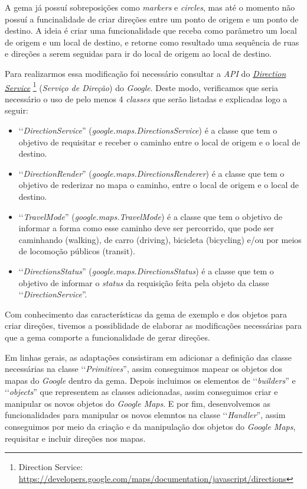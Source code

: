 A gema já possuí sobreposições como \emph{markers} e \emph{circles}, mas até o momento não possuí a 
funcinalidade de criar direções entre um ponto de origem e um ponto de destino. A ideia é criar 
uma funcionalidade que receba como parâmetro um local de origem e um local de destino, e retorne como
resultado uma sequência de ruas e direções a serem seguidas para ir do local de origem ao local de destino.

Para realizarmos essa modificação foi necessário consultar a \emph{API} do 
\emph{\href{https://developers.google.com/maps/documentation/javascript/directions}{Direction Service}} 
\footnote{Direction Service: \url{https://developers.google.com/maps/documentation/javascript/directions}}
(\emph{Serviço de Direção}) do \emph{Google}. Deste modo, verificamos que seria necessário o uso de pelo
menos 4 \emph{classes} que serão listadas e explicadas logo a seguir:

\begin{itemize}

 \item ‘‘\emph{DirectionService}'' (\emph{google.maps.DirectionsService}) é a classe que tem o 
 objetivo de requisitar e receber o caminho entre o local de origem e o local de destino.
 
 \item ‘‘\emph{DirectionRender}'' (\emph{google.maps.DirectionsRenderer}) é a classe que tem o 
 objetivo de rederizar no mapa o caminho, entre o local de origem e o local de destino.
 
 \item ‘‘\emph{TravelMode}'' (\emph{google.maps.TravelMode}) é a classe que tem o objetivo de 
 informar a forma como esse caminho deve ser percorrido, que pode ser caminhando (walking), de carro 
 (driving), bicicleta (bicycling) e/ou por meios de locomoção públicos (transit).
 
 \item ‘‘\emph{DirectionsStatus}'' (\emph{google.maps.DirectionsStatus}) é a classe que tem o
 objetivo de informar o \emph{status} da requisição feita pela objeto da classe
 ‘‘\emph{DirectionService}''.
 
\end{itemize}

Com conhecimento das características da gema de exemplo e dos objetos para criar direções, tivemos a
possiblidade de elaborar as modificações necessárias para que a gema comporte a funcionalidade de
gerar direções.

Em linhas gerais, as adaptações consistiram em adicionar a definição das classe
necessárias na classe ‘‘\emph{Primitives}'', assim conseguimos mapear os objetos dos mapas do
\emph{Google} dentro da gema. Depois incluimos os elementos de ‘‘\emph{builders}'' e ‘‘\emph{objects}''
que representem as classes adicionadas, assim conseguimos criar e manipular os novos objetos do
\emph{Google Maps}. E por fim, desenvolvemos as funcionalidades para manipular os novos elemntos
na classe ‘‘\emph{Handler}'', assim conseguimos por meio da criação e da manipulação dos objetos do
\emph{Google Maps}, requisitar e incluir direções nos mapas.

